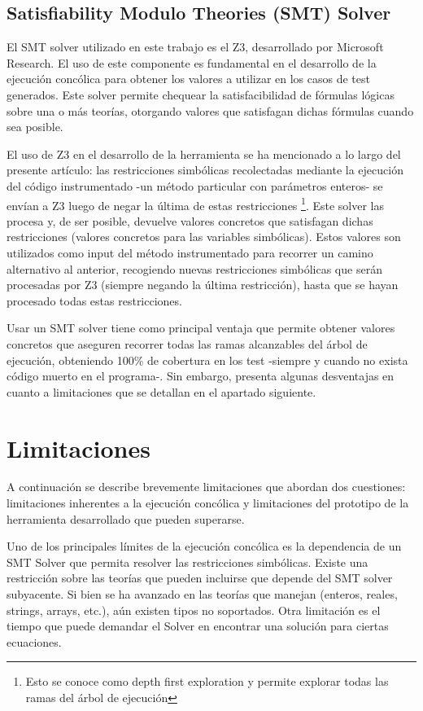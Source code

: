 \documentclass{llncs}
\begin{document}
\subsection{Satisfiability Modulo Theories (SMT) Solver}
El SMT solver utilizado en este trabajo es el Z3, desarrollado por Microsoft Research. El uso de este componente es fundamental en el desarrollo
de la ejecución concólica para obtener los valores a utilizar en los casos de test generados. Este solver permite chequear la satisfacibilidad
de fórmulas lógicas sobre una o más teorías, otorgando valores que satisfagan dichas fórmulas cuando sea posible.

El uso de Z3 en el desarrollo de la herramienta se ha mencionado a lo largo del presente artículo: las restricciones simbólicas recolectadas mediante
la ejecución del código instrumentado -un método particular con parámetros enteros- se envían a Z3 luego de negar la última de estas
restricciones \footnote{Esto se conoce como depth first exploration y permite explorar todas las ramas del árbol de ejecución}. Este solver las procesa y,
de ser posible, devuelve valores concretos que satisfagan dichas restricciones (valores concretos para las variables simbólicas). Estos valores son
utilizados como input del método instrumentado para recorrer un camino alternativo al anterior, recogiendo nuevas restricciones simbólicas que serán
procesadas por Z3 (siempre negando la última restricción), hasta que se hayan procesado todas estas restricciones.

Usar un SMT solver tiene como principal ventaja que permite obtener valores concretos que aseguren recorrer todas las ramas alcanzables del árbol de ejecución,
obteniendo 100\% de cobertura en los test -siempre y cuando no exista código muerto en el programa-. Sin embargo, presenta algunas desventajas en cuanto a
limitaciones que se detallan en el apartado siguiente.

\section{Limitaciones}
A continuación se describe brevemente limitaciones que abordan dos cuestiones: limitaciones inherentes a la ejecución concólica y limitaciones
del prototipo de la herramienta desarrollado que pueden superarse.

Uno de los principales límites de la ejecución concólica es la dependencia de un SMT Solver que permita resolver las restricciones simbólicas.
Existe una restricción sobre las teorías que pueden incluirse que depende del SMT solver subyacente. Si bien se ha avanzado en las teorías
que manejan (enteros, reales, strings, arrays, etc.), aún existen tipos no soportados. Otra limitación es el tiempo que puede demandar el
Solver en encontrar una solución para ciertas ecuaciones.
\end{document}
